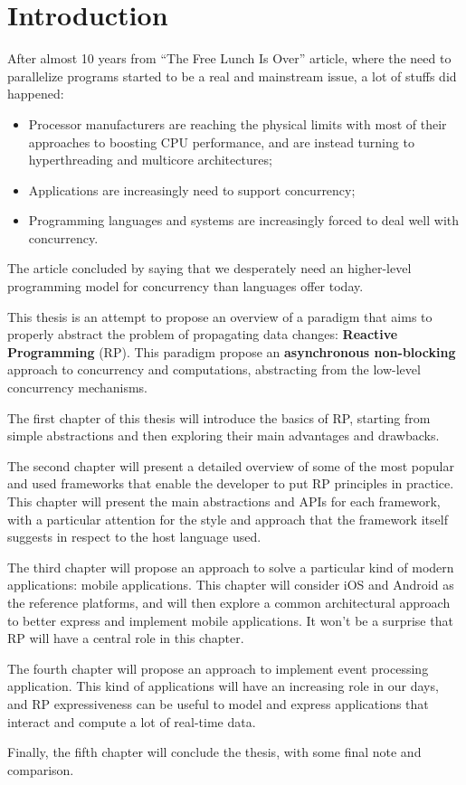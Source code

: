 \chapter{Introduction}
\label{ch:intro}

After almost 10 years from ``The Free Lunch Is Over'' article, where the
need to parallelize programs started to be a real and mainstream issue,
a lot of stuffs did happened:

\begin{itemize}
\item
  Processor manufacturers are reaching the physical limits with most of
  their approaches to boosting CPU performance, and are instead turning
  to hyperthreading and multicore architectures;
\item
  Applications are increasingly need to support concurrency;
\item
  Programming languages and systems are increasingly forced to deal well
  with concurrency.
\end{itemize}

The article concluded by saying that we desperately need an higher-level
programming model for concurrency than languages offer today.

This thesis is an attempt to propose an overview of a paradigm that aims
to properly abstract the problem of propagating data changes:
\textbf{Reactive Programming} (RP). This paradigm propose an
\textbf{asynchronous non-blocking} approach to concurrency and
computations, abstracting from the low-level concurrency mechanisms.


The first chapter of this thesis will introduce the basics of RP, starting from simple abstractions and then exploring their main advantages and drawbacks.

The second chapter will present a detailed overview of some of the most popular and used frameworks that enable the developer to put RP principles in practice. This chapter will present the main abstractions and APIs for each framework, with a particular attention for the style and approach that the framework itself suggests in respect to the host language used.

The third chapter will propose an approach to solve a particular kind of modern applications: mobile applications. This chapter will consider iOS and Android as the reference platforms, and will then explore a common architectural approach to better express and implement mobile applications. It won't be a surprise that RP will have a central role in this chapter.

The fourth chapter will propose an approach to implement event processing application. This kind of applications will have an increasing role in our days, and RP expressiveness can be useful to model and express applications that interact and compute a lot of real-time data.

Finally, the fifth chapter will conclude the thesis, with some final note and comparison.


